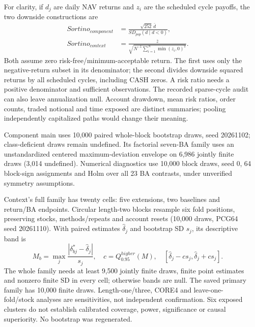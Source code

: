For clarity, if $d_j$ are daily NAV returns and $z_i$ are the scheduled
cycle payoffs, the two downside constructions are
\begin{align}
Sortino_{component}&=\frac{\sqrt{252}\,\bar d}
 {SD_{pop}(d\mid d<0)},\\
Sortino_{context}&=\frac{\bar z}
 {\sqrt{N^{-1}\sum_{i=1}^{N}\min(z_i,0)^2}}.
\end{align}
Both assume zero risk-free/minimum-acceptable return. The first uses
only the negative-return subset in its denominator; the second divides
downside squared returns by all scheduled cycles, including CASH zeros.
A risk ratio needs a positive denominator and sufficient observations. The recorded sparse-cycle audit can also
leave annualization null. Account drawdown, mean risk ratios, order
counts, traded notional and time exposed are distinct summaries; pooling
independently capitalized paths would change their meaning.

Component main uses 10,000 paired whole-block bootstrap draws, seed
20261102; class-deficient draws remain undefined. Its factorial seven-BA
family uses an unstandardized centered maximum-deviation envelope on
6,986 jointly finite draws (3,014 undefined). Numerical diagnostics use
10,000 block draws, seed 0, 64 block-sign assignments and Holm over all
23 BA contrasts, under unverified symmetry assumptions.

Context's full family has twenty cells: five extensions, two baselines
and return/BA endpoints. Circular length-two blocks resample six fold
positions, preserving stocks, methods/repeats and account resets (10,000
draws, PCG64 seed 20261110). With paired estimates $\hat\delta_j$ and
bootstrap SD $s_j$, its descriptive band is
\begin{equation}
M_b=\max_j\frac{|\delta^*_{bj}-\hat\delta_j|}{s_j},\quad
c=Q_{0.95}^{higher}(M),\quad [\hat\delta_j-cs_j,\hat\delta_j+cs_j].
\end{equation}
The whole family needs at least 9,500 jointly finite draws, finite point
estimates and nonzero finite SD in every cell; otherwise bands are null.
The saved primary family has 10,000 finite draws. Length-one/three,
CORE4 and leave-one-fold/stock analyses are sensitivities, not independent
confirmation. Six exposed clusters do not establish calibrated coverage,
power, significance or causal superiority. No bootstrap was regenerated.

